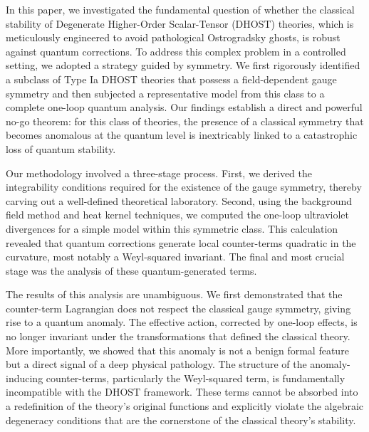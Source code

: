 \documentclass[twocolumn]{aastex631}
\begin{document}
In this paper, we investigated the fundamental question of whether the classical stability of Degenerate Higher-Order Scalar-Tensor (DHOST) theories, which is meticulously engineered to avoid pathological Ostrogradsky ghosts, is robust against quantum corrections. To address this complex problem in a controlled setting, we adopted a strategy guided by symmetry. We first rigorously identified a subclass of Type Ia DHOST theories that possess a field-dependent gauge symmetry and then subjected a representative model from this class to a complete one-loop quantum analysis. Our findings establish a direct and powerful no-go theorem: for this class of theories, the presence of a classical symmetry that becomes anomalous at the quantum level is inextricably linked to a catastrophic loss of quantum stability.

Our methodology involved a three-stage process. First, we derived the integrability conditions required for the existence of the gauge symmetry, thereby carving out a well-defined theoretical laboratory. Second, using the background field method and heat kernel techniques, we computed the one-loop ultraviolet divergences for a simple model within this symmetric class. This calculation revealed that quantum corrections generate local counter-terms quadratic in the curvature, most notably a Weyl-squared invariant. The final and most crucial stage was the analysis of these quantum-generated terms.

The results of this analysis are unambiguous. We first demonstrated that the counter-term Lagrangian does not respect the classical gauge symmetry, giving rise to a quantum anomaly. The effective action, corrected by one-loop effects, is no longer invariant under the transformations that defined the classical theory. More importantly, we showed that this anomaly is not a benign formal feature but a direct signal of a deep physical pathology. The structure of the anomaly-inducing counter-terms, particularly the Weyl-squared term, is fundamentally incompatible with the DHOST framework. These terms cannot be absorbed into a redefinition of the theory's original functions and explicitly violate the algebraic degeneracy conditions that are the cornerstone of the classical theory's stability.
\end{document}

